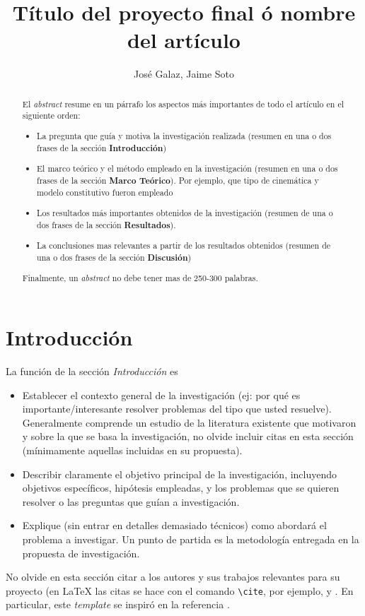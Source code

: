 \documentclass[12pt, letterpaper]{article}
\title{T\'itulo del proyecto final \'o nombre del art\'iculo}
\author{Jos\'e Galaz, Jaime Soto}
\date{}
\begin{document}
\maketitle

\begin{abstract}
	El {\it abstract} resume en un p\'arrafo los aspectos m\'as importantes de todo el art\'iculo en el siguiente orden:
	\begin{itemize}
		\item La pregunta que gu\'ia y motiva la investigaci\'on realizada (resumen en una o dos frases de la secci\'on {\bf Introducci\'on})
		\item El marco te\'orico y el m\'etodo empleado en la investigaci\'on (resumen en una o dos frases de la secci\'on {\bf Marco Te\'orico}). Por ejemplo, que tipo de cinem\'atica y modelo constitutivo fueron empleado
		\item Los resultados m\'as importantes obtenidos de la investigaci\'on (resumen de una o dos frases de la secci\'on {\bf Resultados}).
		\item La conclusiones mas relevantes a partir de los resultados obtenidos (resumen de una o dos frases de la secci\'on {\bf Discusi\'on})
	\end{itemize}
 Finalmente, un {\it abstract} no debe tener mas de 250-300 palabras.
\end{abstract}

\section{Introducci\'on}
La funci\'on de la secci\'on {\it Introducci\'on} es 
\begin{itemize}
	\item Establecer el contexto general de la investigaci\'on (ej: por qu\'e es importante/interesante resolver problemas del tipo que usted resuelve). Generalmente comprende un estudio de la literatura existente que motivaron y sobre la que se basa la investigaci\'on, no olvide incluir citas en esta secci\'on (m\'inimamente aquellas incluidas en su propuesta).
	\item Describir claramente el objetivo principal de la investigaci\'on, incluyendo objetivos espec\'ificos, hip\'otesis empleadas, y los problemas que se quieren resolver o las preguntas que gu\'ian a investigaci\'on.
	\item Explique (sin entrar en detalles demasiado t\'ecnicos) como abordar\'a el problema a investigar. Un punto de partida es la metodolog\'ia entregada en la propuesta de investigaci\'on.
\end{itemize}
No olvide en esta secci\'on citar a los autores y sus trabajos relevantes para su proyecto (en {\LaTeX} las citas se hace con el comando {\tt \textbackslash cite{}}, por ejemplo, \cite{hughes2000} y  \cite{goktepekuhl2009}. En particular, este {\it template} se inspir\'o en la referencia \cite{riceweb}.
\end{document}
